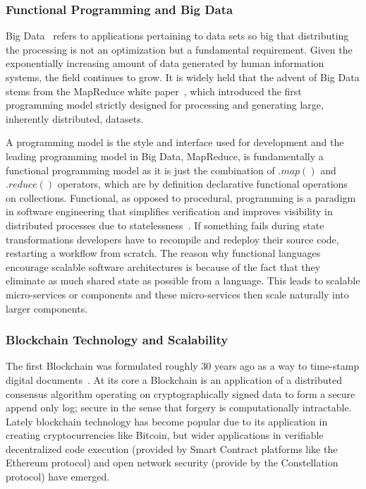 \documentclass[runningheads]{llncs}
\begin{document}
\subsubsection{Functional Programming and Big Data}
Big Data~\cite{ref_article11,ref_book2} refers to applications pertaining to data sets so big that distributing the processing is not an optimization but a fundamental requirement. Given the exponentially increasing amount of data generated by human information systems, the field continues to grow. It is widely held that the advent of Big Data stems from the MapReduce white paper~\cite{ref_proc1}, which introduced the first programming model strictly designed for processing and generating large, inherently distributed, datasets. 

A programming model is the style and interface used for development and the leading programming model in Big Data, MapReduce, is fundamentally a functional programming model as it is just the combination of $.map()$ and $.reduce()$ operators, which are by definition declarative functional operations on collections. Functional, as opposed to procedural, programming is a paradigm in software engineering that simplifies verification and improves visibility in distributed processes due to statelessness~\cite{ref_book3}. If something fails during state transformations developers have to recompile and redeploy their source code, restarting a workflow from scratch. The reason why functional languages encourage scalable software architectures is because of the fact that they eliminate as much shared state as possible from a language. This leads to scalable micro-services or components and these micro-services then scale naturally into larger components.

\subsubsection{Blockchain Technology and Scalability}
The first Blockchain was formulated roughly 30 years ago as a way to time-stamp digital documents~\cite{ref_article13}. At its core a Blockchain is an application of a distributed consensus algorithm operating on cryptographically signed data to form a secure append only log; secure in the sense that forgery is computationally intractable. Lately blockchain technology has become popular due to its application in creating cryptocurrencies like Bitcoin, but wider applications in verifiable decentralized code execution (provided by Smart Contract platforms like the Ethereum protocol) and open network security (provide by the Constellation protocol) have emerged. 
\end{document}
